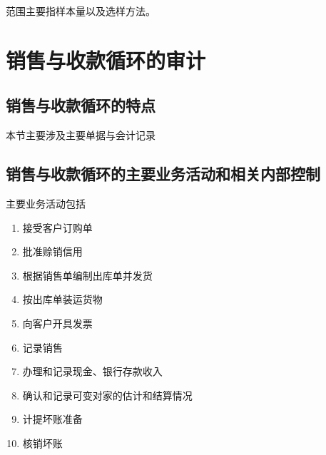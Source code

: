 \documentclass[UTF8,12pt]{ctexart}
\numberwithin{equation}{section} %
\numberwithin{figure}{section}
\numberwithin{table}{section}
\begin{document}
	范围主要指样本量以及选样方法。	
	
	\newpage
	\section{销售与收款循环的审计}
	\subsection{销售与收款循环的特点}
	本节主要涉及主要单据与会计记录
	
	\subsection{销售与收款循环的主要业务活动和相关内部控制}
	主要业务活动包括
	\begin{enumerate}
		\item 接受客户订购单
		
		\item 批准赊销信用
		
		\item 根据销售单编制出库单并发货
		
		\item 按出库单装运货物
		
		\item 向客户开具发票
		
		\item 记录销售
		
		\item 办理和记录现金、银行存款收入
		
		\item 确认和记录可变对家的估计和结算情况
		
		\item 计提坏账准备
		
		\item 核销坏账
	\end{enumerate}
	
\end{document}
